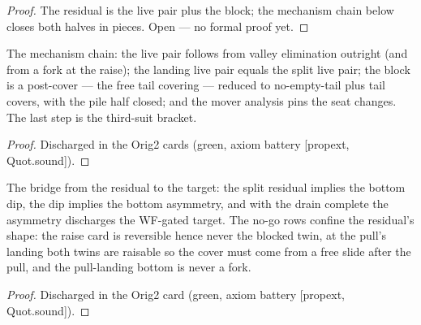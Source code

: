 \begin{proof}
The residual is the live pair plus the block; the mechanism
chain below closes both halves in pieces.  Open --- no formal
proof yet.
\end{proof}

\begin{theorem}\label{thm:splitMechanism}
\leanok
{}
The mechanism chain: the live pair follows from valley
elimination outright (and from a fork at the raise); the landing
live pair equals the split live pair; the block is a
post-cover --- the free tail covering --- reduced to
no-empty-tail plus tail covers, with the pile half closed; and
the mover analysis pins the seat changes.  The last step is
the third-suit bracket.
\end{theorem}

\begin{proof}
\leanok
Discharged in the Orig2 cards (green, axiom battery [propext, Quot.sound]).
\end{proof}

\begin{theorem}\label{thm:bridge}
\leanok
{}
The bridge from the residual to the target: the split residual
implies the bottom dip, the dip implies the bottom asymmetry,
and with the drain complete the asymmetry discharges the
WF-gated target.  The no-go rows confine the residual's shape:
the raise card is reversible hence never the blocked twin, at
the pull's landing both twins are raisable so the cover must
come from a free slide after the pull, and the pull-landing
bottom is never a fork.
\end{theorem}

\begin{proof}
\leanok
Discharged in the Orig2 card (green, axiom battery [propext, Quot.sound]).
\end{proof}

